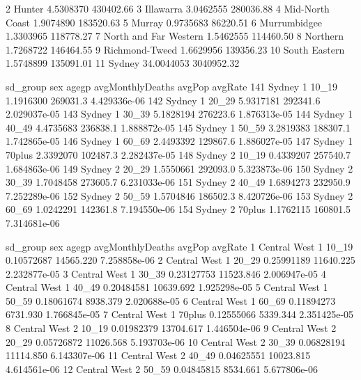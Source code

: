 \documentclass[a4paper]{article}                %
\begin{document}
\begin{Schunk}
\begin{Soutput}
2                 Hunter             4.5308370   430402.66
3              Illawarra             3.0462555   280036.88
4        Mid-North Coast             1.9074890   183520.63
5                 Murray             0.9735683    86220.51
6           Murrumbidgee             1.3303965   118778.27
7  North and Far Western             1.5462555   114460.50
8               Northern             1.7268722   146464.55
9         Richmond-Tweed             1.6629956   139356.23
10         South Eastern             1.5748899   135091.01
11                Sydney            34.0044053  3040952.32
\end{Soutput}
\begin{Soutput}
    sd_group sex  agegp avgMonthlyDeaths   avgPop      avgRate
141   Sydney   1  10_19        1.1916300 269031.3 4.429336e-06
142   Sydney   1  20_29        5.9317181 292341.6 2.029037e-05
143   Sydney   1  30_39        5.1828194 276223.6 1.876313e-05
144   Sydney   1  40_49        4.4735683 236838.1 1.888872e-05
145   Sydney   1  50_59        3.2819383 188307.1 1.742865e-05
146   Sydney   1  60_69        2.4493392 129867.6 1.886027e-05
147   Sydney   1 70plus        2.3392070 102487.3 2.282437e-05
148   Sydney   2  10_19        0.4339207 257540.7 1.684863e-06
149   Sydney   2  20_29        1.5550661 292093.0 5.323873e-06
150   Sydney   2  30_39        1.7048458 273605.7 6.231033e-06
151   Sydney   2  40_49        1.6894273 232950.9 7.252289e-06
152   Sydney   2  50_59        1.5704846 186502.3 8.420726e-06
153   Sydney   2  60_69        1.0242291 142361.8 7.194550e-06
154   Sydney   2 70plus        1.1762115 160801.5 7.314681e-06
\end{Soutput}
\begin{Soutput}
       sd_group sex  agegp avgMonthlyDeaths    avgPop      avgRate
1  Central West   1  10_19       0.10572687 14565.220 7.258858e-06
2  Central West   1  20_29       0.25991189 11640.225 2.232877e-05
3  Central West   1  30_39       0.23127753 11523.846 2.006947e-05
4  Central West   1  40_49       0.20484581 10639.692 1.925298e-05
5  Central West   1  50_59       0.18061674  8938.379 2.020688e-05
6  Central West   1  60_69       0.11894273  6731.930 1.766845e-05
7  Central West   1 70plus       0.12555066  5339.344 2.351425e-05
8  Central West   2  10_19       0.01982379 13704.617 1.446504e-06
9  Central West   2  20_29       0.05726872 11026.568 5.193703e-06
10 Central West   2  30_39       0.06828194 11114.850 6.143307e-06
11 Central West   2  40_49       0.04625551 10023.815 4.614561e-06
12 Central West   2  50_59       0.04845815  8534.661 5.677806e-06

\end{Soutput}
\end{Schunk}
\end{document}
